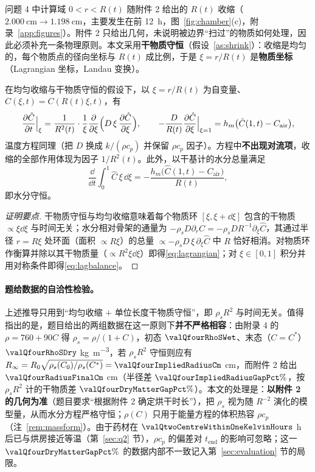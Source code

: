 问题 4 中计算域 $0<r<R(t)$ 随附件 2 给出的 $R(t)$ 收缩（$\SI{2.000}{\centi\meter}\to\SI{1.198}{\centi\meter}$，主要发生在前 \SI{12}{\hour}，图~\ref{fig:chamber}(c)，附录~\ref{app:figures}）。附件 2 只给出几何，未说明被边界“扫过”的物质如何处理，因此必须补充一条物理原则。本文采用\textbf{干物质守恒}（假设~\ref{as:shrink}）：收缩是均匀的，每个物质点的径向坐标与 $R(t)$ 成比例，于是 $\xi=r/R(t)$ 是\textbf{物质坐标}（Lagrangian 坐标，Landau 变换\cite{landau1950,crank1984}）。

\begin{proposition}[物质坐标下的方程]\label{prop:landau}
在均匀收缩与干物质守恒的假设下，以 $\xi=r/R(t)$ 为自变量、$\hat C(\xi,t)=C(R(t)\xi,t)$，有
\begin{equation}
\frac{\partial \hat C}{\partial t}\Big|_{\xi}=\frac{1}{R^2(t)}\cdot\frac1\xi\frac{\partial }{\partial \xi}\Bigl(D\,\xi\,\frac{\partial \hat C}{\partial \xi}\Bigr),\qquad
-\frac{D}{R(t)}\frac{\partial \hat C}{\partial \xi}\Big|_{\xi=1}=h_m\bigl(\hat C(1,t)-C_{\mathrm{air}}\bigr),
\label{eq:lagrangian}
\end{equation}
温度方程同理（把 $D$ 换成 $k/(\rho c_p)$ 并保留 $\rho c_p$ 因子）。方程中\textbf{不出现对流项}，收缩的全部作用体现为因子 $1/R^2(t)$。此外，以干基计的水分总量满足
\begin{equation}
\frac{\dd}{\dd t}\int_0^1\hat C\,\xi\,\dd\xi=-\frac{h_m\bigl(\hat C(1,t)-C_{\mathrm{air}}\bigr)}{R(t)} ,
\label{eq:lagbalance}
\end{equation}
即水分守恒。
\end{proposition}
\begin{proof}[证明要点]
干物质守恒与均匀收缩意味着每个物质环 $[\xi,\xi+\dd\xi]$ 包含的干物质 $\propto\xi\dd\xi$ 与时间无关；水分相对骨架的通量为 $-\rho_sD\partial_rC=-\rho_sD R^{-1}\partial_\xi\hat C$，其通过半径 $r=R\xi$ 处环面（面积 $\propto R\xi$）的总量 $\propto -\rho_s D\,\xi\,\partial_\xi\hat C$ 中 $R$ 恰好相消。对物质环作衡算并除以其干物质量（$\propto R^2\xi\dd\xi$）即得\eqref{eq:lagrangian}；对 $\xi\in[0,1]$ 积分并用对称条件即得\eqref{eq:lagbalance}。
\end{proof}

\paragraph{题给数据的自洽性检验。} 上述推导只用到“均匀收缩 $+$ 单位长度干物质守恒”，即 $\rho_sR^2$ 与时间无关。值得指出的是，题目给出的两组数据在这一原则下\textbf{并不严格相容}：由附录 4 的 $\rho=760+90C$ 得 $\rho_s=\rho/(1+C)$，初态 $\valQfourRhoSWet$、末态（$C=C^\ast$）$\valQfourRhoSDry$ \si{\kilo\gram\per\cubic\meter}，若 $\rho_sR^2$ 守恒则应有 $R_\infty=R_0\sqrt{\rho_s(C_0)/\rho_s(C^\ast)}=\valQfourImpliedRadiusCm$ \si{\centi\meter}，而附件 2 给出 $\valQfourRadiusFinalCm$ \si{\centi\meter}（半径差 $\valQfourImpliedRadiusGapPct\%$，按 $\rho_sR^2$ 计的干物质差 $\valQfourDryMatterGapPct\%$）。本文的处理是：\textbf{以附件 2 的几何为准}（题目要求“根据附件 2 确定烘干时长”），把 $\rho_s$ 视为随 $R^{-2}$ 演化的模型量，从而水分方程严格守恒；$\rho(C)$ 只用于能量方程的体积热容 $\rho c_p$（注~\ref{rem:massform}）。由于药材在 $\valQtwoCentreWithinOneKelvinHours$ h 后已与烘房接近等温（第~\ref{sec:q2} 节），$\rho c_p$ 的偏差对 $t_{\mathrm{end}}$ 的影响可忽略；这一 $\valQfourDryMatterGapPct\%$ 的数据内部不一致记入第~\ref{sec:evaluation} 节的局限。

